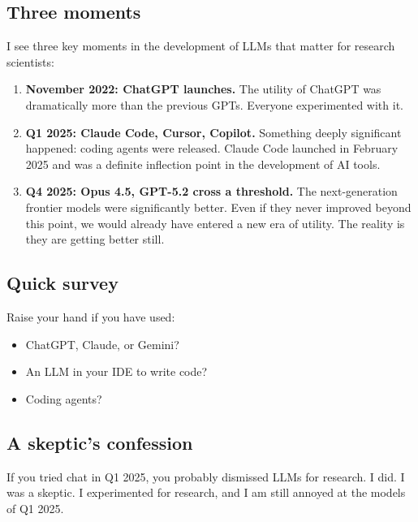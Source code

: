 \subsection{Three moments}

I see three key moments in the development of LLMs that matter for
research scientists:

\begin{enumerate}[(1)]
  \item \textbf{November 2022: ChatGPT launches.}  The utility of
    ChatGPT was dramatically more than the previous GPTs.  Everyone
    experimented with it.

  \item \textbf{Q1 2025: Claude Code, Cursor, Copilot.}  Something
    deeply significant happened: coding agents were released.  Claude
    Code launched in February 2025 and was a definite inflection point in
    the development of AI tools.

  \item \textbf{Q4 2025: Opus 4.5, GPT-5.2 cross a threshold.}  The
    next-generation frontier models were significantly better.  Even if
    they never improved beyond this point, we would already have entered
    a new era of utility.  The reality is they are getting better still.
\end{enumerate}

\subsection{Quick survey}

\begin{audience}
  Raise your hand if you have used:
  \begin{itemize}
    \item ChatGPT, Claude, or Gemini?
    \item An LLM in your IDE to write code?
    \item Coding agents?
  \end{itemize}
\end{audience}

\subsection{A skeptic's confession}

If you tried chat in Q1 2025, you probably dismissed LLMs for research.
I did.  I was a skeptic.  I experimented for research, and I am still
annoyed at the models of Q1 2025.

